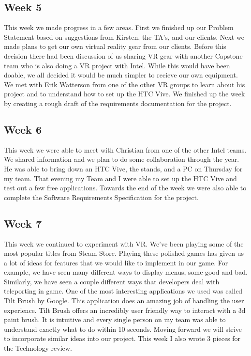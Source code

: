 \documentclass[10pt,journal,compsoc,onecolumn, draftclsnofoot]{IEEEtran}
\begin{document}
\subsection{Week 5}
This week we made progress in a few areas.
First we finished up our Problem Statement based on suggestions from Kirsten, the TA's, and our clients.
Next we made plans to get our own virtual reality gear from our clients.
Before this decision there had been discussion of us sharing VR gear with another Capstone team who is also doing a VR project with Intel.
While this would have been doable, we all decided it would be much simpler to recieve our own equipment.
We met with Erik Watterson from one of the other VR groups to learn about his project and to understand how to set up the HTC Vive.
We finished up the week by creating a rough draft of the requirements documentation for the project.

\subsection{Week 6}
This week we were able to meet with Christian from one of the other Intel teams.
We shared information and we plan to do some collaboration through the year.
He was able to bring down an HTC Vive, the stands, and a PC on Thursday for my team.
That evening my Team and I were able to set up the HTC Vive and test out a few free applications.
Towards the end of the week we were also able to complete the Software Requirements Specification for the project.

\subsection{Week 7}
This week we continued to experiment with VR. We've been playing some of the most popular titles from Steam Store.
Playing these polished games has given us a lot of ideas for features that we would like to implement in our game.
For example, we have seen many different ways to display menus, some good and bad.
Similarly, we have seen a couple different ways that developers deal with teleporting in game.
One of the most interesting applications we used was called Tilt Brush by Google.
This application does an amazing job of handling the user experience.
Tilt Brush offers an incredibly user friendly way to interact with a 3d paint brush.
It is intuitive and every single person on my team was able to understand exactly what to do within 10 seconds.
Moving forward we will strive to incorporate similar ideas into our project.
This week I also wrote 3 pieces for the Technology review.
\end{document}
